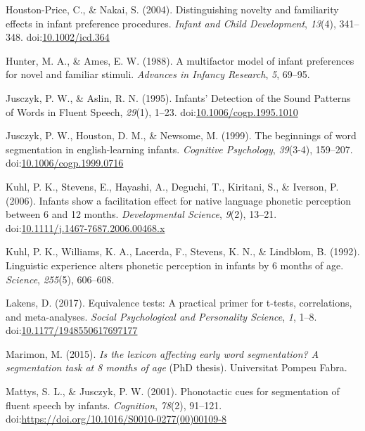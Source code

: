 \documentclass[man,floatsintext]{apa6}
\begin{document}
\leavevmode\hypertarget{ref-houstonprice2004}{}%
Houston-Price, C., \& Nakai, S. (2004). Distinguishing novelty and familiarity effects in infant preference procedures. \emph{Infant and Child Development}, \emph{13}(4), 341--348. doi:\href{https://doi.org/10.1002/icd.364}{10.1002/icd.364}

\leavevmode\hypertarget{ref-hunter1988}{}%
Hunter, M. A., \& Ames, E. W. (1988). A multifactor model of infant preferences for novel and familiar stimuli. \emph{Advances in Infancy Research}, \emph{5}, 69--95.

\leavevmode\hypertarget{ref-jusczyk1995}{}%
Jusczyk, P. W., \& Aslin, R. N. (1995). Infants' Detection of the Sound Patterns of Words in Fluent Speech, \emph{29}(1), 1--23. doi:\href{https://doi.org/10.1006/cogp.1995.1010}{10.1006/cogp.1995.1010}

\leavevmode\hypertarget{ref-jusczyk1999}{}%
Jusczyk, P. W., Houston, D. M., \& Newsome, M. (1999). The beginnings of word segmentation in english-learning infants. \emph{Cognitive Psychology}, \emph{39}(3-4), 159--207. doi:\href{https://doi.org/10.1006/cogp.1999.0716}{10.1006/cogp.1999.0716}

\leavevmode\hypertarget{ref-kuhl2006}{}%
Kuhl, P. K., Stevens, E., Hayashi, A., Deguchi, T., Kiritani, S., \& Iverson, P. (2006). Infants show a facilitation effect for native language phonetic perception between 6 and 12 months. \emph{Developmental Science}, \emph{9}(2), 13--21. doi:\href{https://doi.org/10.1111/j.1467-7687.2006.00468.x}{10.1111/j.1467-7687.2006.00468.x}

\leavevmode\hypertarget{ref-kuhl1992}{}%
Kuhl, P. K., Williams, K. A., Lacerda, F., Stevens, K. N., \& Lindblom, B. (1992). Linguistic experience alters phonetic perception in infants by 6 months of age. \emph{Science}, \emph{255}(5), 606--608.

\leavevmode\hypertarget{ref-lakens2017}{}%
Lakens, D. (2017). Equivalence tests: A practical primer for t-tests, correlations, and meta-analyses. \emph{Social Psychological and Personality Science}, \emph{1}, 1--8. doi:\href{https://doi.org/10.1177/1948550617697177}{10.1177/1948550617697177}

\leavevmode\hypertarget{ref-marimon2015}{}%
Marimon, M. (2015). \emph{Is the lexicon affecting early word segmentation? A segmentation task at 8 months of age} (PhD thesis). Universitat Pompeu Fabra.

\leavevmode\hypertarget{ref-mattys2001}{}%
Mattys, S. L., \& Jusczyk, P. W. (2001). Phonotactic cues for segmentation of fluent speech by infants. \emph{Cognition}, \emph{78}(2), 91--121. doi:\href{https://doi.org/https://doi.org/10.1016/S0010-0277(00)00109-8}{https://doi.org/10.1016/S0010-0277(00)00109-8}
\end{document}
